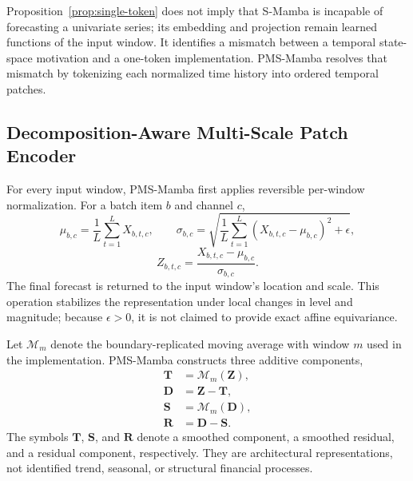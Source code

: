 Proposition~\ref{prop:single-token} does not imply that S-Mamba is incapable of forecasting a univariate series; its embedding and projection remain learned functions of the input window.
It identifies a mismatch between a temporal state-space motivation and a one-token implementation.
PMS-Mamba resolves that mismatch by tokenizing each normalized time history into ordered temporal patches.

\subsection{Decomposition-Aware Multi-Scale Patch Encoder}

For every input window, PMS-Mamba first applies reversible per-window normalization.
For a batch item $b$ and channel $c$,
\begin{equation}
    \mu_{b,c}=\frac{1}{L}\sum_{t=1}^{L}X_{b,t,c},
    \qquad
    \sigma_{b,c}=\sqrt{\frac{1}{L}\sum_{t=1}^{L}(X_{b,t,c}-\mu_{b,c})^2+\epsilon},
\end{equation}
\begin{equation}
    Z_{b,t,c}=\frac{X_{b,t,c}-\mu_{b,c}}{\sigma_{b,c}}.
\end{equation}
The final forecast is returned to the input window's location and scale.
This operation stabilizes the representation under local changes in level and magnitude; because $\epsilon>0$, it is not claimed to provide exact affine equivariance.

Let $\mathcal{M}_m$ denote the boundary-replicated moving average with window $m$ used in the implementation.
PMS-Mamba constructs three additive components,
\begin{align}
    \mathbf{T} &= \mathcal{M}_m(\mathbf{Z}), \\
    \mathbf{D} &= \mathbf{Z}-\mathbf{T}, \\
    \mathbf{S} &= \mathcal{M}_m(\mathbf{D}), \\
    \mathbf{R} &= \mathbf{D}-\mathbf{S}.
\end{align}
The symbols $\mathbf{T}$, $\mathbf{S}$, and $\mathbf{R}$ denote a smoothed component, a smoothed residual, and a residual component, respectively.
They are architectural representations, not identified trend, seasonal, or structural financial processes.


